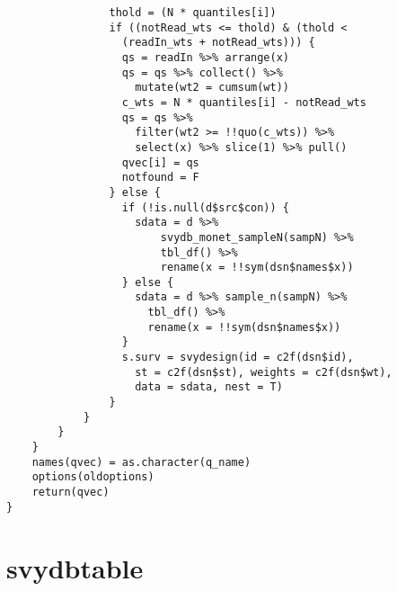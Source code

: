 \begin{lstlisting}
                thold = (N * quantiles[i])
                if ((notRead_wts <= thold) & (thold < 
                  (readIn_wts + notRead_wts))) {
                  qs = readIn %>% arrange(x)
                  qs = qs %>% collect() %>% 
                    mutate(wt2 = cumsum(wt))
                  c_wts = N * quantiles[i] - notRead_wts
                  qs = qs %>% 
                    filter(wt2 >= !!quo(c_wts)) %>% 
                    select(x) %>% slice(1) %>% pull()
                  qvec[i] = qs
                  notfound = F
                } else {
                  if (!is.null(d$src$con)) {
                    sdata = d %>% 
                        svydb_monet_sampleN(sampN) %>% 
                        tbl_df() %>% 
                        rename(x = !!sym(dsn$names$x))
                  } else {
                    sdata = d %>% sample_n(sampN) %>% 
                      tbl_df() %>% 
                      rename(x = !!sym(dsn$names$x))
                  }
                  s.surv = svydesign(id = c2f(dsn$id), 
                    st = c2f(dsn$st), weights = c2f(dsn$wt), 
                    data = sdata, nest = T)
                }
            }
        }
    }
    names(qvec) = as.character(q_name)
    options(oldoptions)
    return(qvec)
}
\end{lstlisting}

\section{svydbtable}

